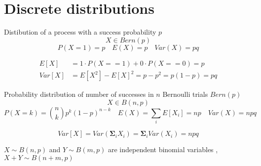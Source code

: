\section{Discrete distributions}
\begin{slide} 
\begin{shaded}
    {\hfill Distibution of a process with a  success probability $p$\hfill}
    $$X \in Bern(p)$$
    $$
    P(X=1) = p 
    \quad 
    E(X)= p
    \quad
    Var(X)=pq
    $$
\end{shaded}
    
    \begin{align*}
        E[X] &= 1\cdot P(X==1) + 0\cdot P(X==0) =p \\
        Var[X] &= E[X^2]-E[X]^2 = p-p^2 =p(1-p) = pq
    \end{align*}
\end{slide}
\begin{slide} 
  \begin{shaded}
 {\hfill\noindent Probability distribution of number of successes in $n$ Bernoulli trials $Bern(p)$
 \hfill}
    $$X \in B(n,p)$$
    $$
    P(X=k) = {n \choose k} p^k(1-p)^{n-k} 
    \quad 
    E(X)=  \sum_iE[X_i] = np
    \quad
    Var(X)=npq
    $$
\end{shaded}
 $$   Var[X] = Var\left(\mathbf{\Sigma}_i X_i\right) = \mathbf{\Sigma}_i Var(X_i) = npq$$

\noindent{}
$X \sim B(n, p)$ and $Y \sim B(m, p)$ are independent binomial variables , $X+Y \sim B(n+m, p)$
\end{slide}

